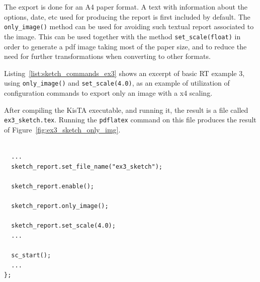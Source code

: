 The export is done for an A4 paper format.
A text with information about the options, date, etc used for producing the report is first included
by default.
The \texttt{only\_image()} method can be used for avoiding such textual report
associated to the image.
%
This can be used together with the method \texttt{set\_scale(float)} in order to 
generate a pdf image taking most of the paper size, and to reduce the need
for further transformations when converting to other formats.

Listing~\ref{list:sketch_commands_ex3} shows 
an excerpt of basic RT example 3, using \texttt{only\_image()} and \texttt{set\_scale(4.0)},
as an example of utilization of configuration commands to export only an image with a x4 scaling.

%
After compiling the KisTA executable, and running it, the result
is a file called \texttt{ex3\_sketch.tex}.
%
Running the \texttt{pdflatex} command on this file produces the result
of Figure~\ref{fig:ex3_sketch_only_img}.

\begin{lstlisting}[style=KistaCodeStyle,caption={Commands controling sketch report in basic RT example 3.},label=list:sketch_commands_ex3]

  ...
  sketch_report.set_file_name("ex3_sketch"); 

  sketch_report.enable();
   
  sketch_report.only_image();
   
  sketch_report.set_scale(4.0);
  ...

  sc_start();
  ...
};

\end{lstlisting}


